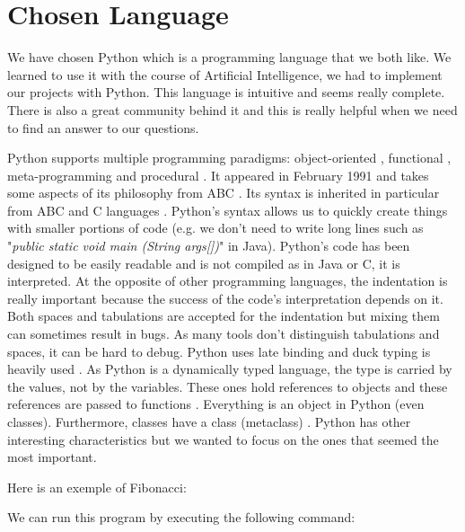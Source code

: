 \section{Chosen Language}
We have chosen Python which is a programming language that we both like. We learned to use it with the course of Artificial Intelligence, we had to implement our projects with Python. This language is intuitive and seems really complete. There is also a great community behind it and this is really helpful when we need to find an answer to our questions.

Python supports multiple programming paradigms: object-oriented \cite{martelli2006python} \cite{functional_doc}, functional \cite{functional_doc} \cite{devtome}, meta-programming \cite{mihai} and procedural \cite{martelli2006python} \cite{functional_doc}.
It appeared in February 1991 and takes some aspects of its philosophy from ABC \cite{python_why}. Its syntax is inherited in particular from ABC and C languages \cite{wikipediaEN_history_python}. Python's syntax allows us to quickly create things with smaller portions of code (e.g. we don't need to write long lines such as "\textit{public static void main (String args[])}" in Java).
Python's code has been designed to be easily readable \cite{ZenPython} and is not compiled as in Java or C, it is interpreted.
At the opposite of other programming languages, the indentation is really important because the success of the code's interpretation depends on it. Both spaces and tabulations are accepted for the indentation but mixing them can sometimes result in bugs. As many tools don't distinguish tabulations and spaces, it can be hard to debug.
Python uses late binding \cite{python_pep0289} and duck typing is heavily used \cite{wikipediaEN_duck_typing_python}.
As Python is a dynamically typed language, the type is carried by the values, not by the variables. These ones hold references to objects and these references are passed to functions \cite{wikipediaEN_python_syntax_semantics}.
Everything is an object in Python (even classes). Furthermore, classes have a class (metaclass) \cite{python_datamodel}.
Python has other interesting characteristics but we wanted to focus on the ones that seemed the most important.
\newline

Here is an exemple of Fibonacci:


We can run this program by executing the following command:



